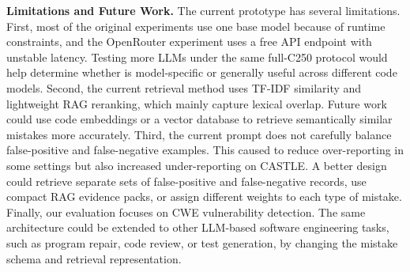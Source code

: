 \noindent\textbf{Limitations and Future Work.}
The current prototype has several limitations. First, most of the original experiments use one base model because of runtime constraints, and the OpenRouter experiment uses a free API endpoint with unstable latency. Testing more LLMs under the same full-C250 protocol would help determine whether \system is model-specific or generally useful across different code models. Second, the current retrieval method uses TF-IDF similarity and lightweight RAG reranking, which mainly capture lexical overlap. Future work could use code embeddings or a vector database to retrieve semantically similar mistakes more accurately. Third, the current prompt does not carefully balance false-positive and false-negative examples. This caused \system to reduce over-reporting in some settings but also increased under-reporting on CASTLE. A better design could retrieve separate sets of false-positive and false-negative records, use compact RAG evidence packs, or assign different weights to each type of mistake. Finally, our evaluation focuses on CWE vulnerability detection. The same architecture could be extended to other LLM-based software engineering tasks, such as program repair, code review, or test generation, by changing the mistake schema and retrieval representation.

